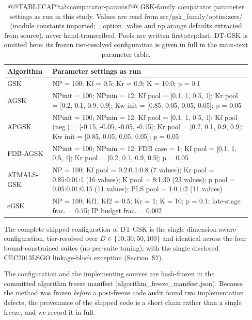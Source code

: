 \documentclass[10pt,a4paper]{article}
\newcommand{\dtgsk}{DT-GSK}
\begin{document}
\begin{table}[H]
\caption{@@TABLECAP!tab:comparator-params@@ GSK-family comparator parameter settings as run in this study. Values
are read from src/gsk\_family/optimizers/ (module constants imported;
\_option\_value and np.arange defaults extracted from source),
never hand-transcribed. Pools are written first:step:last. \dtgsk{} is
omitted here: its frozen tier-resolved configuration is given in full in the
main-text parameter table.}\label{tab:comparator-params}




\begin{tabular}{@{}l p{11.4cm}@{}}
\toprule
\textbf{Algorithm} & \textbf{Parameter settings as run} \\
\midrule
GSK & NP = 100; Kf = 0.5; Kr = 0.9; K = 10.0; p = 0.1 \\
AGSK & NPinit = 100; NPmin = 12; Kf pool = [0.1, 1, 0.5, 1]; Kr pool = [0.2, 0.1, 0.9, 0.9]; Kw init = [0.85, 0.05, 0.05, 0.05]; p = 0.05 \\
APGSK & NPinit = 100; NPmin = 12; Kf pool = [0.1, 1, 0.5, 1]; Kf pool (neg.) = [-0.15, -0.05, -0.05, -0.15]; Kr pool = [0.2, 0.1, 0.9, 0.9]; Kw init = [0.85, 0.05, 0.05, 0.05]; p = 0.05 \\
FDB-AGSK & NPinit = 100; NPmin = 12; FDB case = 1; Kf pool = [0.1, 1, 0.5, 1]; Kr pool = [0.2, 0.1, 0.9, 0.9]; p = 0.05 \\
ATMALS-GSK & NP = 100; Kf pool = 0.2:0.1:0.8 (7 values); Kr pool = 0.85:0.01:1 (16 values); K pool = 8:1:30 (23 values); p pool = 0.05:0.01:0.15 (11 values); PLS pool = 1:0.1:2 (11 values) \\
eGSK & NP = 100; Kf1, Kf2 = 0.5; Kr = 1; K = 10; p = 0.1; late-stage frac. = 0.75; IP budget frac. = 0.002 \\
\bottomrule
\end{tabular}



\end{table}

The complete shipped configuration of \dtgsk{} is the single
dimension-aware configuration, tier-resolved over
$D \in \{10, 30, 50, 100\}$ and identical across the four
bound-constrained suites (no per-suite tuning), with the single
disclosed CEC2013LSGO linkage-block exception (Section~S7).

The configuration and the implementing sources are hash-frozen in the
committed algorithm freeze manifest
(algorithm\_freeze\_manifest.json).  Because the method was frozen
\emph{before} a post-freeze code audit found two implementation defects, the
provenance of the shipped code is a short chain rather than a single freeze, and
we record it in full.
\end{document}
